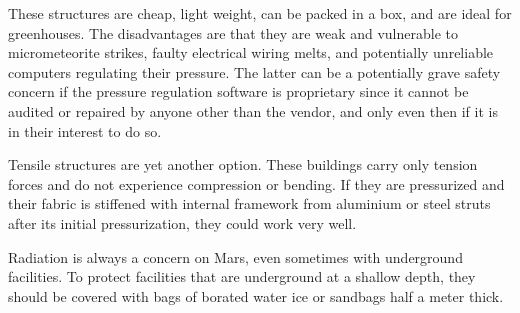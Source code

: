 These structures are cheap, light weight, can be packed in a box, and are ideal for greenhouses. The disadvantages are that they are weak and vulnerable to micrometeorite strikes, faulty electrical wiring melts, and potentially unreliable computers regulating their pressure. The latter can be a potentially grave safety concern if the pressure regulation software is proprietary since it cannot be audited or repaired by anyone other than the vendor, and only even then if it is in their interest to do so.

Tensile structures are yet another option. These buildings carry only tension forces and do not experience compression or bending. If they are pressurized and their fabric is stiffened with internal framework from aluminium or steel struts after its initial pressurization, they could work very well.

Radiation is always a concern on Mars, even sometimes with underground facilities. To protect facilities that are underground at a shallow depth, they should be covered with bags of borated water ice or sandbags half a meter thick.


